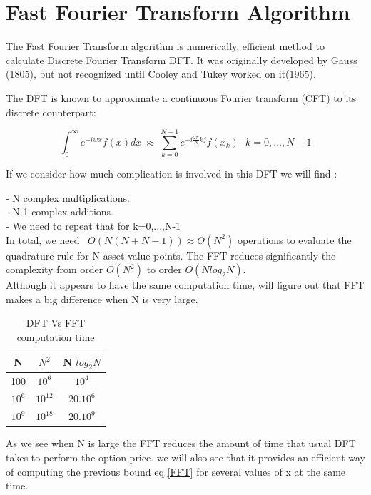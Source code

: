 \documentclass[12pt]{report}
\begin{document}
\section{Fast Fourier Transform Algorithm}
The Fast Fourier Transform algorithm is numerically, efficient method to calculate Discrete Fourier Transform DFT. It was originally developed by Gauss (1805), but not recognized until Cooley and Tukey worked on it(1965).

The DFT is known to approximate a continuous Fourier transform (CFT) to its discrete counterpart:

\begin{equation}
\int_{0}^{\infty} e^{-iwx}f(x) dx ~\approx ~ \sum \limits_{k=0}^{N-1} e^{-i \frac{2\pi}{N}kj} f(x_k)~~~ k=0,...,N-1
\label{FFT}
\end{equation}


If we consider how much complication is involved in this DFT we will find :

- N complex multiplications.\\
- N-1 complex additions. \\
- We need to repeat that for k=0,...,N-1\\

In total, we need ~$O(N(N+N-1)) \approx O(N^2)$  operations to evaluate the quadrature rule for N asset value points. The FFT reduces significantly the complexity from order $O(N^2)$ to order $O(N log_2N)$.\\
 Although it appears to  have the same computation time, will figure out that FFT makes  a big difference when N is very large.
\begin {table}[h!]
\begin{center}
 \begin{tabular}{||c c c ||} 
 \hline
N & $N^2$ & N $log_2 N$ \\ [0.5ex] 
 \hline\hline
 100 & $10^6$ & $10^4$ \\ 
 \hline
 $10^6$ & $10^{12}$ & $20.10^6$ \\
 \hline
 $10^9$ & $10^{18}$ & $20.10^9$  \\
 \hline
\end{tabular}
\end{center}
\caption {DFT Vs FFT computation time }
\end{table}


 As we see when N is large the FFT reduces the amount of time that usual DFT takes to perform the option price. we will also see that it provides an efficient way of computing the previous bound eq \eqref{FFT} for several values of x at the same time.\\
\end{document}
